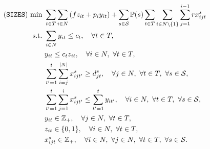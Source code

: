 
\begin{subequations}
	\begin{align}
	(\texttt{SIZES})\ \textrm{min}\ &\sum_{t\in T}\sum_{i\in N} \left(fz_{it} + p_i y_{it} \right) + 
	\sum_{s\in \mathcal{S}} \PP(s)\sum_{t\in T}\sum_{i\in N\backslash\{1\}}\sum_{j=1}^{i-1}rx_{ijt}^s \label{sizes:obj}\\
	\textrm{s.t.}\ &\sum_{i\in N}y_{it}\le c_{t},\quad \forall t\in T, \label{sizes:b}\\
	&y_{it}\le c_{t} z_{it},\quad\forall i \in N,\ \forall t\in T,\label{sizes:c}\\
	&\sum_{t'=1}^{t}\sum_{i=j}^{|N|} x_{ijt'}^s \ge d_{jt}^s,\quad\forall j\in N,\ \forall t\in T,\  \forall s\in \mathcal{S},\label{sizes:d}\\
	&\sum_{t'=1}^{t}\sum_{j=1}^{i}x_{ijt'}^s\le\sum_{t'=1}^{t}y_{it'}, \quad\forall i\in N,\ \forall t\in T,\ \forall s\in \mathcal{S},\label{sizes:e}\\
	&y_{it}\in\mathbb{Z}_+,\quad \forall j\in N,\ \forall t\in T,\label{sizes:f}\\
	&z_{it}\in\{0,1\},\quad\forall i\in N,\ \forall t\in T,\label{sizes:g}\\
	&x_{ijt}^s\in\mathbb{Z}_+,\quad\forall i\in N,\ \forall j\in N,\ \forall t\in T,\ \forall s\in \mathcal{S}.\label{sizes:h}
	\end{align}
\end{subequations}

